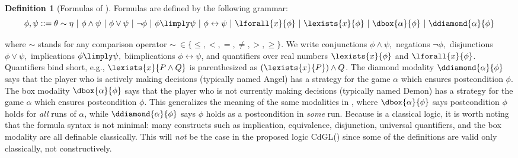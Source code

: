 \documentclass[12pt]{cmuthesis}
\theoremstyle{definition}
\newtheorem{definition}{Definition}
\theoremstyle{remark}
\newcommand{\bebecomes}{\mathrel{::=}}
\newcommand{\alternative}{~|~}
\newcommand{\rref}[2][]{\prettyref{#2}}
\newcommand{\lequiv}{\leftrightarrow}
\newcommand{\CdGL}{\textsf{CdGL}\xspace}
\begin{document}
\begin{definition}[Formulas of \dGL]
  Formulas are defined by the following grammar:
\[\phi,\psi \bebecomes \theta \sim \eta \alternative \phi \land \psi \alternative \phi \lor \psi \alternative \lnot \phi \alternative \phi \limply \psi \alternative \phi \lequiv \psi \alternative \lforall{x}{\phi} \alternative \lexists{x}{\phi} \alternative \dbox{\alpha}{\phi} \alternative \ddiamond{\alpha}{\phi}\]
\end{definition}
where $\sim$ stands for any comparison operator $\sim~\in \{\leq, <, =, \neq, >, \geq\}$.
We write conjunctions $\phi \land \psi,$ negations $\lnot\phi,$ disjunctions $\phi \lor \psi,$ implications $\phi \limply \psi,$ biimplications $\phi \lequiv \psi$, and quantifiers over real numbers $\lexists{x}{\phi}$ and $\lforall{x}{\phi}$.
Quantifiers bind short, e.g., $\lexists{x}{P \land Q}$ is parenthesized as $(\lexists{x}{P}) \land Q$.
The diamond modality $\ddiamond{\alpha}{\phi}$ says that the player who is actively making decisions (typically named Angel) has a strategy for the game $\alpha$ which ensures postcondition $\phi$.
The box modality $\dbox{\alpha}{\phi}$ says that the player who is not currently making decisions (typically named Demon) has a strategy for the game $\alpha$ which ensures postcondition $\phi$.
This generalizes the meaning of the same modalities in \dL, where $\dbox{\alpha}{\phi}$ says postcondition $\phi$ holds for \emph{all} runs of $\alpha$, while $\ddiamond{\alpha}{\phi}$ says $\phi$ holds as a postcondition in \emph{some} run.
Because \dGL is a classical logic, it is worth noting that the formula syntax is not minimal: many constructs such as implication, equivalence, disjunction, universal quantifiers, and the box modality are all definable classically.
This will \emph{not} be the case in the proposed logic \CdGL (\rref{ch:cgl}) since some of the definitions are valid only classically, not constructively.
\end{document}
